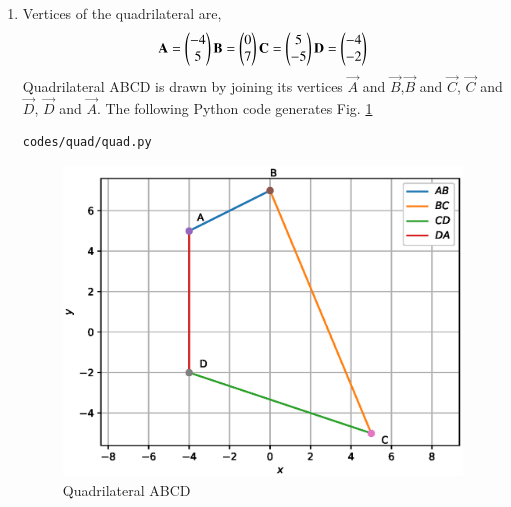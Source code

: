 \renewcommand{\theequation}{\theenumi}
\begin{enumerate}[label=\thesection.\arabic*.,ref=\thesection.\theenumi]

\item Vertices of the quadrilateral are,
\begin{align}
\mathbf{A}=\begin{pmatrix}-4\\5\end{pmatrix}
\mathbf{B}=\begin{pmatrix}0\\7\end{pmatrix}
\mathbf{C}=\begin{pmatrix}5\\-5\end{pmatrix}
\mathbf{D}=\begin{pmatrix}-4\\-2\end{pmatrix}
\end{align}
Quadrilateral ABCD is drawn by joining its vertices $\vec{A}$ and $\vec{B}$,$\vec{B}$ and $\vec{C}$, $\vec{C}$ and $\vec{D}$, $\vec{D}$ and $\vec{A}$.
 The  following Python code generates Fig. \ref{fig:quad_py}
%
\begin{lstlisting}
codes/quad/quad.py
\end{lstlisting}
\begin{figure}[!ht]
\centering
\includegraphics[width=\columnwidth]{./codes/quad/pyfigs/quad.eps}
\caption{Quadrilateral ABCD}
\label{fig:quad_py}
\end{figure}


\end{enumerate}
